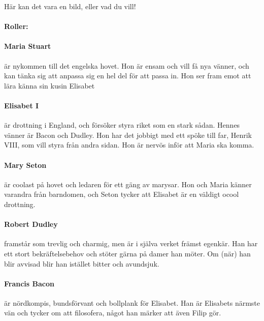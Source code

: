 \documentclass{laspex}
\begin{document}
\begin{framsida}
\begin{center}
    Här kan det vara en bild, eller vad du vill!
\end{center}
\end{framsida}

\begin{karaktarsida}
\paragraph{Roller:}
\paragraph{Maria Stuart} är nykommen till det engelska hovet. Hon är ensam och vill få nya vänner, och kan tänka sig att anpassa sig en hel del för att passa in. Hon ser fram emot att lära känna sin kusin Elisabet 

\paragraph{Elisabet I} är drottning i England, och försöker styra riket som en stark sådan. Hennes vänner är Bacon och Dudley. Hon har det jobbigt med ett spöke till far, Henrik VIII, som vill styra från andra sidan. Hon är nervös inför att Maria ska komma.

\paragraph{Mary Seton} är coolast på hovet och ledaren för ett gäng av marysar. Hon och Maria känner varandra från barndomen, och Seton tycker att Elisabet är en väldigt ocool drottning. 

\paragraph{Robert Dudley} framstår som trevlig och charmig, men är i själva verket främst egenkär. Han har ett stort bekräftelsebehov och stöter gärna på damer han möter. Om (när) han blir avvisad blir han istället bitter och avundsjuk.


\paragraph{Francis Bacon} är nördkompis, bundsförvant och bollplank för Elisabet. Han är Elisabets närmste vän och tycker om att filosofera, något han märker att även Filip gör.


\end{karaktarsida}
\end{document}
